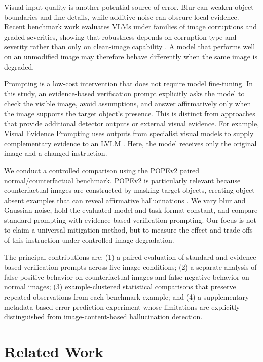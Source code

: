 \documentclass[conference]{IEEEtran}
\begin{document}
Visual input quality is another potential source of error. Blur can weaken object boundaries and fine details, while additive noise can obscure local evidence. Recent benchmark work evaluates VLMs under families of image corruptions and graded severities, showing that robustness depends on corruption type and severity rather than only on clean-image capability \cite{saxena2026robustbench}. A model that performs well on an unmodified image may therefore behave differently when the same image is degraded.

Prompting is a low-cost intervention that does not require model fine-tuning. In this study, an evidence-based verification prompt explicitly asks the model to check the visible image, avoid assumptions, and answer affirmatively only when the image supports the target object's presence. This is distinct from approaches that provide additional detector outputs or external visual evidence. For example, Visual Evidence Prompting uses outputs from specialist visual models to supply complementary evidence to an LVLM \cite{li2025vep}. Here, the model receives only the original image and a changed instruction.

We conduct a controlled comparison using the POPEv2 paired normal/counterfactual benchmark. POPEv2 is particularly relevant because counterfactual images are constructed by masking target objects, creating object-absent examples that can reveal affirmative hallucinations \cite{li2026popev2}. We vary blur and Gaussian noise, hold the evaluated model and task format constant, and compare standard prompting with evidence-based verification prompting. Our focus is not to claim a universal mitigation method, but to measure the effect and trade-offs of this instruction under controlled image degradation.

The principal contributions are: (1) a paired evaluation of standard and evidence-based verification prompts across five image conditions; (2) a separate analysis of false-positive behavior on counterfactual images and false-negative behavior on normal images; (3) example-clustered statistical comparisons that preserve repeated observations from each benchmark example; and (4) a supplementary metadata-based error-prediction experiment whose limitations are explicitly distinguished from image-content-based hallucination detection.

\section{Related Work}
\end{document}
